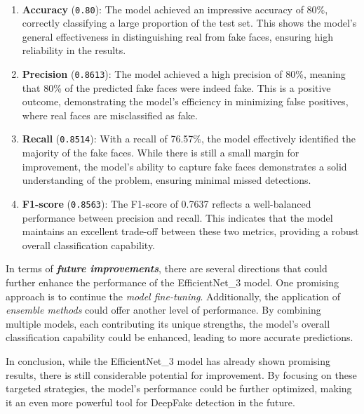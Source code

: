 \documentclass[12pt]{article}
\begin{document}
    \begin{center}
    \end{center}
    { \hspace*{\fill} \\}
    
    \begin{enumerate}
\def\labelenumi{\arabic{enumi}.}
\item
  \textbf{Accuracy} (\texttt{0.80}): The model achieved an impressive
  accuracy of 80\%, correctly classifying a large proportion of the test
  set. This shows the model's general effectiveness in distinguishing
  real from fake faces, ensuring high reliability in the results.
\item
  \textbf{Precision} (\texttt{0.8613}): The model achieved a high
  precision of 80\%, meaning that 80\% of the predicted fake faces were
  indeed fake. This is a positive outcome, demonstrating the model's
  efficiency in minimizing false positives, where real faces are
  misclassified as fake.
\item
  \textbf{Recall} (\texttt{0.8514}): With a recall of 76.57\%, the model
  effectively identified the majority of the fake faces. While there is
  still a small margin for improvement, the model's ability to capture
  fake faces demonstrates a solid understanding of the problem, ensuring
  minimal missed detections.
\item
  \textbf{F1-score} (\texttt{0.8563}): The F1-score of 0.7637 reflects a
  well-balanced performance between precision and recall. This indicates
  that the model maintains an excellent trade-off between these two
  metrics, providing a robust overall classification capability.
\end{enumerate}

In terms of \textbf{\emph{future improvements}}, there are several
directions that could further enhance the performance of the
EfficientNet\_3 model. One promising approach is to continue the
\emph{model fine-tuning}. Additionally, the application of
\emph{ensemble methods} could offer another level of performance. By
combining multiple models, each contributing its unique strengths, the
model's overall classification capability could be enhanced, leading to
more accurate predictions.

In conclusion, while the EfficientNet\_3 model has already shown
promising results, there is still considerable potential for
improvement. By focusing on these targeted strategies, the model's
performance could be further optimized, making it an even more powerful
tool for DeepFake detection in the future.
\end{document}
